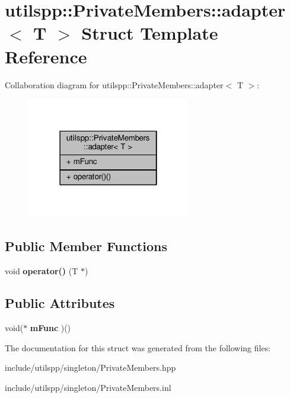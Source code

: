 \hypertarget{structutilspp_1_1PrivateMembers_1_1adapter}{\section{utilspp\-:\-:Private\-Members\-:\-:adapter$<$ T $>$ Struct Template Reference}
\label{structutilspp_1_1PrivateMembers_1_1adapter}
}


Collaboration diagram for utilspp\-:\-:Private\-Members\-:\-:adapter$<$ T $>$\-:
\nopagebreak
\begin{figure}[H]
\begin{center}
\leavevmode
\includegraphics[width=202pt]{structutilspp_1_1PrivateMembers_1_1adapter__coll__graph}
\end{center}
\end{figure}
\subsection*{Public Member Functions}
\begin{DoxyCompactItemize}
\item 
\hypertarget{structutilspp_1_1PrivateMembers_1_1adapter_a2be7b2ab20c93e9c299a6eeeeb06d4d9}{void {\bfseries operator()} (T $\ast$)}\label{structutilspp_1_1PrivateMembers_1_1adapter_a2be7b2ab20c93e9c299a6eeeeb06d4d9}

\end{DoxyCompactItemize}
\subsection*{Public Attributes}
\begin{DoxyCompactItemize}
\item 
\hypertarget{structutilspp_1_1PrivateMembers_1_1adapter_ab8ad3f1f149b6e5ad4554a7c0d6718ad}{void($\ast$ {\bfseries m\-Func} )()}\label{structutilspp_1_1PrivateMembers_1_1adapter_ab8ad3f1f149b6e5ad4554a7c0d6718ad}

\end{DoxyCompactItemize}


The documentation for this struct was generated from the following files\-:\begin{DoxyCompactItemize}
\item 
include/utilspp/singleton/Private\-Members.\-hpp\item 
include/utilspp/singleton/Private\-Members.\-inl\end{DoxyCompactItemize}
